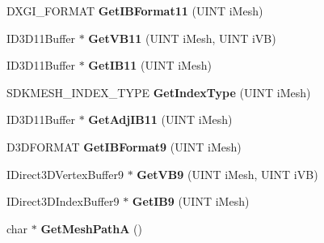 \begin{DoxyCompactItemize}
\item 
\hypertarget{class_c_d_x_u_t_s_d_k_mesh_a7f42680628ba5a64a58c56616cde8e65}{D\+X\+G\+I\+\_\+\+F\+O\+R\+M\+A\+T {\bfseries Get\+I\+B\+Format11} (U\+I\+N\+T i\+Mesh)}\label{class_c_d_x_u_t_s_d_k_mesh_a7f42680628ba5a64a58c56616cde8e65}

\item 
\hypertarget{class_c_d_x_u_t_s_d_k_mesh_ab5ae4ff709f102132b2e6fdb54a0530a}{I\+D3\+D11\+Buffer $\ast$ {\bfseries Get\+V\+B11} (U\+I\+N\+T i\+Mesh, U\+I\+N\+T i\+V\+B)}\label{class_c_d_x_u_t_s_d_k_mesh_ab5ae4ff709f102132b2e6fdb54a0530a}

\item 
\hypertarget{class_c_d_x_u_t_s_d_k_mesh_a5f416d160b31fb1e252a472608ba8719}{I\+D3\+D11\+Buffer $\ast$ {\bfseries Get\+I\+B11} (U\+I\+N\+T i\+Mesh)}\label{class_c_d_x_u_t_s_d_k_mesh_a5f416d160b31fb1e252a472608ba8719}

\item 
\hypertarget{class_c_d_x_u_t_s_d_k_mesh_a5c35f4ff9d7141420fd1b8811545a670}{S\+D\+K\+M\+E\+S\+H\+\_\+\+I\+N\+D\+E\+X\+\_\+\+T\+Y\+P\+E {\bfseries Get\+Index\+Type} (U\+I\+N\+T i\+Mesh)}\label{class_c_d_x_u_t_s_d_k_mesh_a5c35f4ff9d7141420fd1b8811545a670}

\item 
\hypertarget{class_c_d_x_u_t_s_d_k_mesh_a638818d5af364c77e25dd3a65e17b1c6}{I\+D3\+D11\+Buffer $\ast$ {\bfseries Get\+Adj\+I\+B11} (U\+I\+N\+T i\+Mesh)}\label{class_c_d_x_u_t_s_d_k_mesh_a638818d5af364c77e25dd3a65e17b1c6}

\item 
\hypertarget{class_c_d_x_u_t_s_d_k_mesh_a2e3bf76cc0d6472b05ef4b1357beae73}{D3\+D\+F\+O\+R\+M\+A\+T {\bfseries Get\+I\+B\+Format9} (U\+I\+N\+T i\+Mesh)}\label{class_c_d_x_u_t_s_d_k_mesh_a2e3bf76cc0d6472b05ef4b1357beae73}

\item 
\hypertarget{class_c_d_x_u_t_s_d_k_mesh_aa424bf434b0060416aa10af1b0bc54ba}{I\+Direct3\+D\+Vertex\+Buffer9 $\ast$ {\bfseries Get\+V\+B9} (U\+I\+N\+T i\+Mesh, U\+I\+N\+T i\+V\+B)}\label{class_c_d_x_u_t_s_d_k_mesh_aa424bf434b0060416aa10af1b0bc54ba}

\item 
\hypertarget{class_c_d_x_u_t_s_d_k_mesh_a741040dd2293587fa0480244d35800fc}{I\+Direct3\+D\+Index\+Buffer9 $\ast$ {\bfseries Get\+I\+B9} (U\+I\+N\+T i\+Mesh)}\label{class_c_d_x_u_t_s_d_k_mesh_a741040dd2293587fa0480244d35800fc}

\item 
\hypertarget{class_c_d_x_u_t_s_d_k_mesh_a617a201a2cbfc9a3dce8c00f458e966d}{char $\ast$ {\bfseries Get\+Mesh\+Path\+A} ()}\label{class_c_d_x_u_t_s_d_k_mesh_a617a201a2cbfc9a3dce8c00f458e966d}


\end{DoxyCompactItemize}
